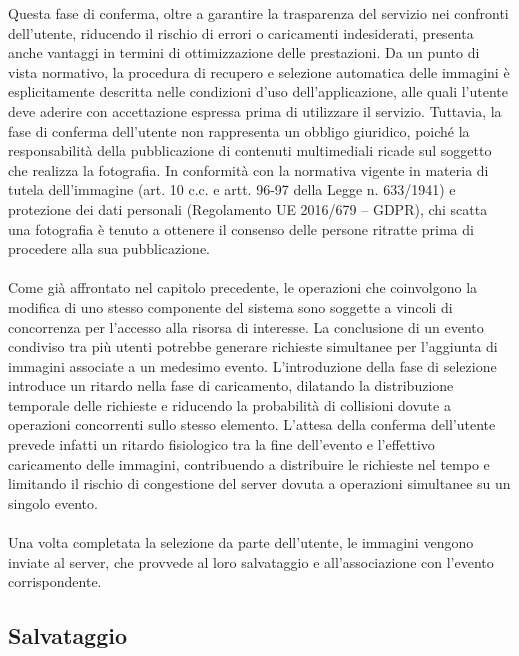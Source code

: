 Questa fase di conferma, oltre a garantire la trasparenza del servizio nei confronti dell’utente, 
riducendo il rischio di errori o caricamenti indesiderati, presenta anche vantaggi in termini di ottimizzazione delle prestazioni. 
\clearpage
Da un punto di vista normativo, la procedura di recupero e selezione automatica delle immagini è esplicitamente descritta nelle condizioni d’uso dell’applicazione, 
alle quali l’utente deve aderire con accettazione espressa prima di utilizzare il servizio. 
Tuttavia, la fase di conferma dell’utente non rappresenta un obbligo giuridico, 
poiché la responsabilità della pubblicazione di contenuti multimediali ricade sul soggetto che realizza la fotografia. 
In conformità con la normativa vigente in materia di tutela dell’immagine (art. 10 c.c. e artt. 96-97 della Legge n. 633/1941) e protezione dei dati personali (Regolamento UE 2016/679 – GDPR), 
chi scatta una fotografia è tenuto a ottenere il consenso delle persone ritratte prima di procedere alla sua pubblicazione.\\
\\
Come già affrontato nel capitolo precedente, le operazioni che coinvolgono la modifica di uno stesso componente del sistema 
sono soggette a vincoli di concorrenza per l’accesso alla risorsa di interesse. 
La conclusione di un evento condiviso tra più utenti potrebbe generare richieste simultanee per l’aggiunta di immagini associate a un medesimo evento. 
L’introduzione della fase di selezione introduce un ritardo nella fase di caricamento, 
dilatando la distribuzione temporale delle richieste e riducendo la probabilità di collisioni dovute a operazioni concorrenti sullo stesso elemento.
L’attesa della conferma dell’utente prevede infatti un ritardo fisiologico tra la fine dell’evento e l’effettivo caricamento delle immagini, 
contribuendo a distribuire le richieste nel tempo e limitando il rischio di congestione del server dovuta a operazioni simultanee su un singolo evento.\\
\\
Una volta completata la selezione da parte dell’utente, le immagini vengono inviate al server, che provvede al loro salvataggio e all’associazione con l’evento corrispondente.


\clearpage

\subsection{ Salvataggio}

